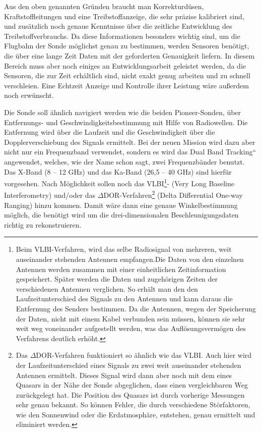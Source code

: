 \bigskip

Aus den oben genannten Gr\"unden braucht man Korrekturd\"usen,
Kraftstoffleitungen und eine Treibstoffanzeige, die sehr pr\"azise
kalibriert sind, und zus\"atzlich noch genaue Kennt\-nisse \"uber die
zeitliche Entwicklung des Treibstoffverbrauchs. Da diese Informationen
be\-sonders wichtig sind, um die Flugbahn der Sonde m\"oglichst genau
zu bestimmen, werden Sensoren ben\"otigt, die \"uber eine lange Zeit
Daten mit der geforderten Genauigkeit liefern. In diesem Bereich muss
aber noch einiges an Entwicklungsarbeit geleistet werden, da die
Sensoren, die zur Zeit erh\"altlich sind, nicht exakt genug arbeiten
und zu schnell verschlei\-{\ss}en. Eine Echtzeit Anzeige und Kontrolle
ihrer Leistung w\"are au{\ss}erdem noch erw\"unscht.


\bigskip

Die Sonde soll \"ahnlich navigiert werden wie die beiden Pioneer-Sonden,
\"uber Entfernungs- und Geschwindigkeitsbestimmung mit Hilfe von
Radiowellen. Die Entfernung wird \"uber die Laufzeit und die
Geschwindigkeit \"uber die Dopplerverschiebung des Signals ermittelt.
Bei der neuen Mission wird dazu aber nicht nur ein Frequenzband
verwendet, sondern es wird das {\quotedblbase}Dual Band Tracking``
angewendet, welches, wie der Name schon sagt, zwei Fre\-quenzb\"ander
benutzt. Das X-Band (8 -- 12 GHz) und das Ka-Band (26,5 -- 40 GHz) sind
hierf\"ur vorgesehen. Nach M\"oglichkeit sollen noch das
VLBI\footnote{Beim VLBI-Verfahren\cite{vlbi}, wird das selbe Radiosignal
von mehreren, weit auseinander stehenden Antennen empfangen.Die Daten
von den einzelnen Antennen werden zusammen mit einer einheitlichen
Zeitinformation gespeichert. Sp\"ater werden die Daten und
zugeh\"origen Zeiten der verschiedenen Antennen verglichen. So erh\"alt
man den den Laufzeitunterschied des Signals zu den Antennen und kann
daraus die Entfernung des Senders bestimmen. Da die Antennen, wegen der
Speicherung der Daten, nicht mit einem Kabel verbunden sein m\"ussen,
k\"onnen sie sehr weit weg voneinander aufgestellt werden, was das
Aufl\"osungsverm\"ogen des Verfahrens deutlich erh\"oht.}{}- (Very Long
Baseline Interfe\-rometry) und/oder das $\Delta
$DOR-Verfahren\footnote{Das $\Delta $DOR-Verfahren\cite{delta} funktioniert
so \"ahnlich wie das VLBI. Auch hier wird der Laufzeitunterschied eines
Signals zu zwei weit auseinander stehenden Antennen ermittelt. Dieses
Signal wird dann aber noch mit dem eines Quasars in der N\"ahe der
Sonde abgeglichen, dass einen vergleichbaren Weg zur\"uckgelegt hat.
Die Position des Quasars ist durch vorherige Messungen sehr genau
bekannt. So k\"onnen Fehler, die durch verschiedene St\"orfaktoren, wie
den Sonnenwind oder die Erdatmosph\"are, entstehen, genau ermittelt und
eliminiert werden.} (Delta Differential One-way Ranging) hinzu kommen.
Damit w\"are dann eine genaue Winkelbestimmung m\"oglich, die
ben\"otigt wird um die drei-dimensionalen Beschleunigungsdaten richtig
zu rekonstruieren. 


